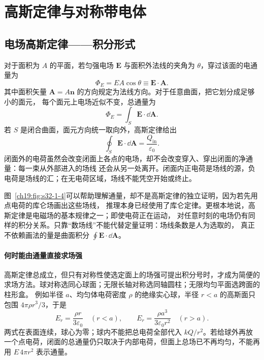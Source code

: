 \section{高斯定律与对称带电体}

\subsection{电场高斯定律——积分形式}


对于面积为 $A$ 的平面，若匀强电场 $\boldsymbol E$ 与面积外法线的夹角为 $\theta$，穿过该面的电通量为
\begin{equation}
  \boxed{\Phi_E=EA\cos\theta\equiv\boldsymbol E\cdot\boldsymbol A}.
\end{equation}
其中面积矢量 $\boldsymbol A=A\boldsymbol n$ 的方向规定为法线方向。对于任意曲面，把它划分成足够小的面元，
每个面元上电场近似不变，总通量为
\[
  \Phi_E=\int_S\boldsymbol E\cdot\dd\boldsymbol A.
\]
若 $S$ 是闭合曲面，面元方向统一取向外，高斯定律给出
\begin{equation}
  \boxed{\oint_S\boldsymbol E\cdot\dd\boldsymbol A
  =\frac{Q_{\mathrm{in}}}{\varepsilon_0}}.
\end{equation}
闭面外的电荷虽然会改变闭面上各点的电场，却不会改变穿入、穿出闭面的净通量：每一束从外部进入的场线
还会从另一处离开。闭面内正电荷是场线的源，负电荷是场线的汇；在无电荷区域，场线不能凭空开始或终止。

\par\noindent\begin{minipage}{\linewidth}
\gaussLawFigure
{}\label{ch19:fig:s32-1-4}
\end{minipage}\par\medskip

图~\ref{ch19:fig:s32-1-4}可以帮助理解通量，却不是高斯定律的独立证明，因为若先用点电荷的库仑场画出这些场线，
推理本身已经使用了库仑定律。更根本地说，高斯定律是电磁场的基本规律之一；即使电荷正在运动，
对任意时刻的电场仍有同样的积分关系。只靠“数场线”不能代替定量证明：场线条数是人为选取的，
真正不依赖画法的量是曲面积分 $\oint\boldsymbol E\cdot\dd\boldsymbol A$。


\paragraph{何时能由通量直接求场强}
高斯定律总成立，但只有对称性使选定面上的场强可提出积分号时，才成为简便的求场方法。球对称选同心球面；无限长轴对称选同轴圆柱；无限均匀平面选跨面的柱形盒。
例如半径 $a$、均匀体电荷密度 $\rho$ 的绝缘实心球，半径 $r<a$ 的高斯面只包围 $4\pi\rho r^3/3$，于是
\[
 E_r=\frac{\rho r}{3\varepsilon_0}\quad(r<a),\qquad
 E_r=\frac{\rho a^3}{3\varepsilon_0r^2}\quad(r>a).
\]
两式在表面连续，球心为零；球内不能把总电荷全部代入 $kQ/r^2$。若给球外再放一个点电荷，闭面的总通量仍只取决于内部电荷，但面上总场已不再均匀，不能再用 $E\,4\pi r^2$ 表示通量。


